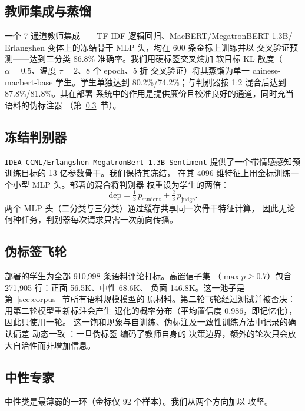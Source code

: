 \documentclass[11pt,a4paper]{article}
\newcommand{\code}[1]{\texttt{#1}}
\begin{document}
\subsection{教师集成与蒸馏}
\label{sec:distill}

一个 7 通道教师集成——TF-IDF 逻辑回归、MacBERT/MegatronBERT-1.3B/
Erlangshen 变体上的冻结骨干 MLP 头，均在 600 条金标上训练并以
交叉验证预测——达到三分类 86.8\% 准确率。我们用硬标签交叉熵加
软目标 KL 散度（$\alpha=0.5$、温度 $\tau=2$、8 个 epoch、5 折
交叉验证）将其蒸馏为单一 chinese-macbert-base 学生。学生单独达到
80.2\%/74.2\%；与判别器按 1:2 混合后达到 87.8\%/81.8\%。其在部署
系统中的作用是提供廉价且校准良好的通道，同时充当语料的伪标注器
（第~\ref{sec:flywheel}~节）。

\subsection{冻结判别器}
\label{sec:judge}

\code{IDEA-CCNL/Erlangshen-}\hspace{0pt}\code{MegatronBert-1.3B-Sentiment}
提供了一个带情感感知预训练目标的 13 亿参数骨干。我们保持其冻结，
在其 4096 维特征上用金标训练一个小型 MLP 头。部署的混合将判别器
权重设为学生的两倍：
\[
  \mathrm{dep} = \tfrac{1}{3}\,p_{\text{student}} +
                \tfrac{2}{3}\,p_{\text{judge}} .
\]
两个 MLP 头（二分类与三分类）通过缓存共享同一次骨干特征计算，
因此无论何种任务，判别器每次请求只需一次前向传播。

\subsection{伪标签飞轮}
\label{sec:flywheel}

部署的学生为全部 910{,}998 条语料评论打标。高置信子集
（$\max p \ge 0.7$）包含 271{,}905 行：正面 56.5K、中性 68.6K、
负面 146.8K。这一池子是第~\ref{sec:corpus}~节所有语料规模模型的
原材料。第二轮飞轮经过测试并被否决：用第二轮模型重新标注会产生
退化的概率分布（平均置信度 0.986，即记忆化），因此只使用一轮。
这一饱和现象与自训练、伪标注及一致性训练方法中记录的确认偏差
动态一致 \citep{arazo2020,xie2020,xie2020uda,sohn2020}：一旦伪标签
编码了教师自身的
决策边界，额外的轮次只会放大自洽性而非增加信息。

\subsection{中性专家}
\label{sec:neu}

中性类是最薄弱的一环（金标仅 92 个样本）。我们从两个方向加以
攻坚。
\end{document}
